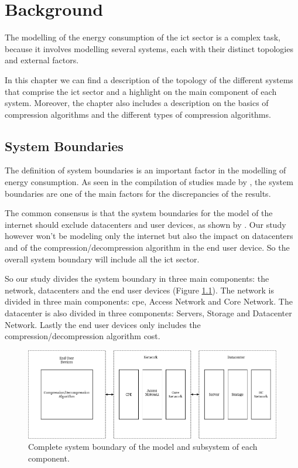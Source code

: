 

\chapter{Background}
\label{chapter:background}

\begin{introduction}
    
    The modelling of the energy consumption of the \ac{ict} sector is a complex task, because it involves modelling several systems, each with their distinct topologies and external factors.

    In this chapter we can find a description of the topology of the different systems that comprise the \ac{ict} sector and a highlight on the main component of each system. Moreover, the chapter also includes a description on the basics of compression algorithms and the different types of compression algorithms.

\end{introduction}

\section{System Boundaries}
\label{section:system_boundaries}

The definition of system boundaries is an important factor in the modelling of energy consumption. As seen in the compilation of studies made by \citet{Aslan2018}, the system boundaries are one of the main factors for the discrepancies of the results.

The common consensus is that the system boundaries for the model of the internet should exclude datacenters and user devices, as shown by \citet{Coroama2014}. Our study however won't be modeling only the internet but also the impact on datacenters and of the compression/decompression algorithm in the end user device. So the overall system boundary will include all the \ac{ict} sector. 

So our study divides the system boundary in three main components: the network, datacenters and the end user devices (Figure \ref{figure:system_boundaries}). The network is divided in three main components: \ac{cpe}, Access Network and Core Network. The datacenter is also divided in three components: Servers, Storage and Datacenter Network. Lastly the end user devices only includes the compression/decompression algorithm cost. 

\begin{figure}[h]
    \centering
    \includegraphics[width=1\textwidth]{figs/System_Boundary.png}
    \caption{Complete system boundary of the model and subsystem of each component.}
    \label{figure:system_boundaries}
\end{figure}

